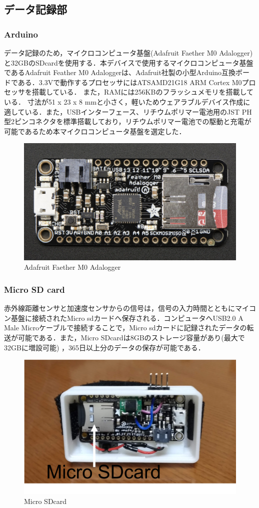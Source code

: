 \subsection*{データ記録部}
\subsubsection*{Arduino}
データ記録のため，マイクロコンピュータ基盤(Adafruit Faether M0 Adalogger)\cite{Utc2018}と32GBのSDcardを使用する．本デバイスで使用するマイクロコンピュータ基盤であるAdafruit Feather M0 Adaloggerは、Adafruit社製の小型Arduino互換ボードである．3.3Vで動作するプロセッサにはATSAMD21G18 ARM Cortex M0プロセッサを搭載している．
また，RAMには256KBのフラッシュメモリを搭載している．
寸法が51 x 23 x 8 mmと小さく，軽いためウェアラブルデバイス作成に適している．また，USBインターフェース、リチウムポリマー電池用のJST PH型2ピンコネクタを標準搭載しており，リチウムポリマー電池での駆動と充電が可能であるため本マイクロコンピュータ基盤を選定した．

\begin{figure}[H]
  \centering
  \includegraphics[width=0.5\linewidth]{fig/adafruit}
  \caption{Adafruit Faether M0 Adalogger\cite{Utc2018}}
  \label{fig:adafruit}
\end{figure}

\subsubsection*{Micro SD card}
赤外線距離センサと加速度センサからの信号は，信号の入力時間とともにマイコン基盤に接続されたMicro sdカードへ保存される．コンピュータへUSB2.0 A Male Microケーブルで接続することで，Micro sdカードに記録されたデータの転送が可能である．また，Micro SDcardは8GBのストレージ容量があり(最大で32GBに増設可能)
，365日以上分のデータの保存が可能である．


\begin{figure}[H]
  \centering
  \includegraphics[width=0.5\linewidth]{fig/sdcard}
  \caption{Micro SDcard}
  \label{fig:sd card}
\end{figure}


